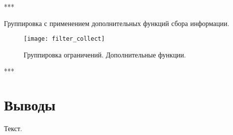 ***

Группировка с применением дополнительных функций сбора информации.

\begin{figure}[H]
	\centering
	\texttt{[image: filter\_collect]}
	\caption{Группировка ограничений. Дополнительные функции.}
	\label{fig:filter_collect}
\end{figure}

***

\section{Выводы}

Текст.
